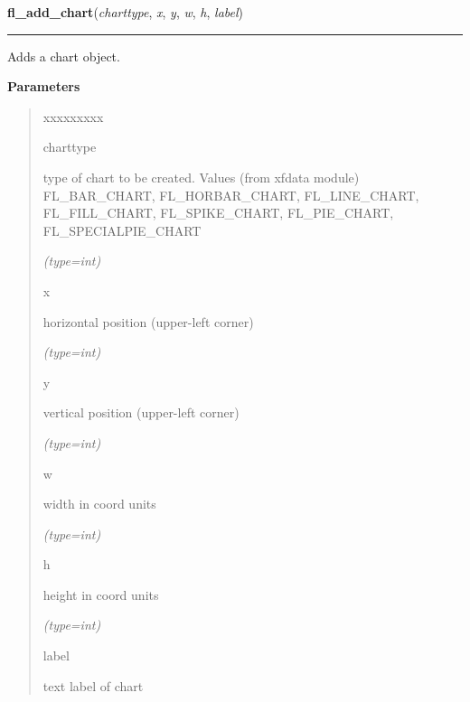     \vspace{0.5ex}

\hspace{.8\funcindent}\begin{boxedminipage}{\funcwidth}

    \raggedright \textbf{fl\_add\_chart}(\textit{charttype}, \textit{x}, \textit{y}, \textit{w}, \textit{h}, \textit{label})

    \vspace{-1.5ex}

    \rule{\textwidth}{0.5\fboxrule}
\setlength{\parskip}{2ex}
    Adds a chart object.

\setlength{\parskip}{1ex}
      \textbf{Parameters}
      \vspace{-1ex}

      \begin{quote}
        \begin{Ventry}{xxxxxxxxx}

          \item[charttype]

          type of chart to be created. Values (from xfdata module) 
          FL\_BAR\_CHART, FL\_HORBAR\_CHART, FL\_LINE\_CHART, 
          FL\_FILL\_CHART, FL\_SPIKE\_CHART, FL\_PIE\_CHART, 
          FL\_SPECIALPIE\_CHART

            {\it (type=int)}

          \item[x]

          horizontal position (upper-left corner)

            {\it (type=int)}

          \item[y]

          vertical position (upper-left corner)

            {\it (type=int)}

          \item[w]

          width in coord units

            {\it (type=int)}

          \item[h]

          height in coord units

            {\it (type=int)}

          \item[label]

          text label of chart


\end{Ventry}
\end{quote}
\end{boxedminipage}
